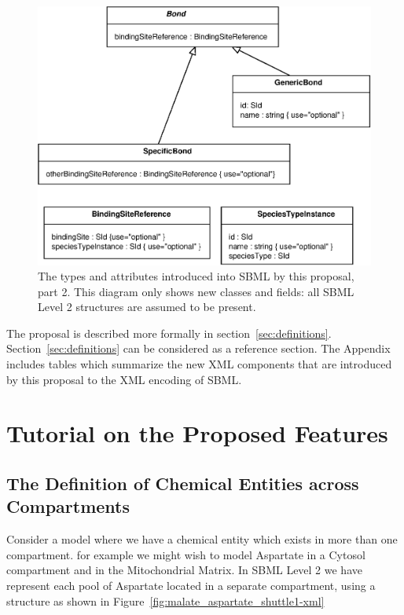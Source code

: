 \documentclass{cekarticle}
\begin{document}
\begin{figure}[h]
  \vspace*{8pt}
  \centering
  \includegraphics[scale = 0.7]{multi-component-species-uml2.eps}
  \caption{The types and attributes introduced into SBML by this proposal, part 2.  This diagram
  only shows new classes and fields: all SBML Level 2 structures are assumed to be present.}
  \label{fig:multi-component-species-uml2}
\end{figure}

The proposal is described more formally in section~\ref{sec:definitions}.
Section~\ref{sec:definitions} can be considered as a reference section.
The Appendix includes tables which summarize the new XML components that
are introduced by this proposal to the XML encoding of SBML.

\clearpage

\section{Tutorial on the Proposed Features}
\label{sec:tutorial}
\subsection{The Definition of Chemical Entities across Compartments}
\label{sec:commonspecies}

Consider a model where we have a chemical entity which exists in more than one compartment.
for example we might wish to model Aspartate in a Cytosol compartment and in the Mitochondrial Matrix.
In SBML Level 2 we have represent each pool of Aspartate located in a separate compartment, using a
 structure as shown in Figure~\ref{fig:malate_aspartate_shuttle1-xml}
\end{document}
